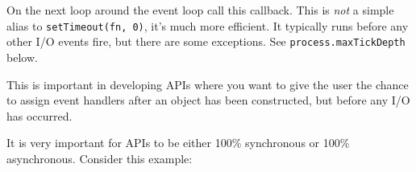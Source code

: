 On the next loop around the event loop call this callback. This is
\emph{not} a simple alias to \texttt{setTimeout(fn, 0)}, it's much more
efficient. It typically runs before any other I/O events fire, but there
are some exceptions. See \texttt{process.maxTickDepth} below.

\begin{Shaded}
\begin{Highlighting}[]
\NormalTok{(}\NormalTok{() \{}
  \NormalTok{(}\NormalTok{);}
\NormalTok{\});}
\end{Highlighting}
\end{Shaded}

This is important in developing APIs where you want to give the user the
chance to assign event handlers after an object has been constructed,
but before any I/O has occurred.

\begin{Shaded}
\begin{Highlighting}[]
 

  \NormalTok{(}\NormalTok{() \{}
    \NormalTok{();}
  \NormalTok{(}\NormalTok{));}
\NormalTok{\}}

  
\NormalTok{();}

\end{Highlighting}
\end{Shaded}

It is very important for APIs to be either 100\% synchronous or 100\%
asynchronous. Consider this example:

\begin{Shaded}
\begin{Highlighting}[]
 
   
    \NormalTok{;}
  \NormalTok{\}}

  \NormalTok{(}
\NormalTok{\}}
\end{Highlighting}
\end{Shaded}

